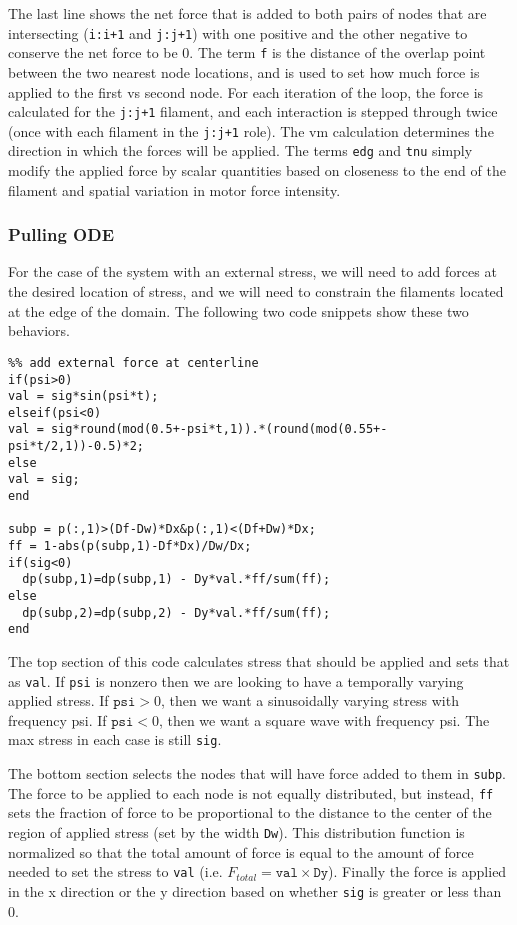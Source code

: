 The last line shows the net force that is added to both pairs of nodes that are intersecting (\texttt{i:i+1} and \texttt{j:j+1}) with one positive and the other negative to conserve the net force to be 0.  The term \texttt{f} is the distance of the overlap point between the two nearest node locations, and is used to set how much force is applied to the first vs second node.  For each iteration of the loop, the force is calculated for the \texttt{j:j+1} filament, and each interaction is stepped through twice (once with each filament in the \texttt{j:j+1} role).  The vm calculation determines the direction in which the forces will be applied.  The terms \texttt{edg} and \texttt{tnu} simply modify the applied force by scalar quantities based on closeness to the end of the filament and spatial variation in motor force intensity.



\subsubsection{Pulling ODE}

For the case of the system with an external stress, we will need to add forces at the desired location of stress, and we will need to constrain the filaments located at the edge of the domain.  The following two code snippets show these two behaviors.


\begin{verbatim}
%% add external force at centerline
if(psi>0)
val = sig*sin(psi*t);
elseif(psi<0)
val = sig*round(mod(0.5+-psi*t,1)).*(round(mod(0.55+-psi*t/2,1))-0.5)*2;
else
val = sig;
end

subp = p(:,1)>(Df-Dw)*Dx&p(:,1)<(Df+Dw)*Dx;
ff = 1-abs(p(subp,1)-Df*Dx)/Dw/Dx;
if(sig<0)
  dp(subp,1)=dp(subp,1) - Dy*val.*ff/sum(ff);
else
  dp(subp,2)=dp(subp,2) - Dy*val.*ff/sum(ff);
end
\end{verbatim}

The top section of this code calculates stress that should be applied and sets that as \texttt{val}.  If \texttt{psi} is nonzero then we are looking to have a temporally varying applied stress.  If $\texttt{psi}>0$, then we want a sinusoidally varying stress with frequency psi.  If $\texttt{psi}<0$, then we want a square wave with frequency psi.  The max stress in each case is still \texttt{sig}.

The bottom section selects the nodes that will have force added to them in \texttt{subp}.  The force to be applied to each node is not equally distributed, but instead, \texttt{ff} sets the fraction of force to be proportional to the distance to the center of the region of applied stress (set by the width \texttt{Dw}).  This distribution function is normalized so that the total amount of force is equal to the amount of force needed to set the stress to \texttt{val} (i.e. $F_{total} = \texttt{val} \times \texttt{Dy}$).  Finally the force is applied in the x direction or the y direction based on whether \texttt{sig} is greater or less than 0.


